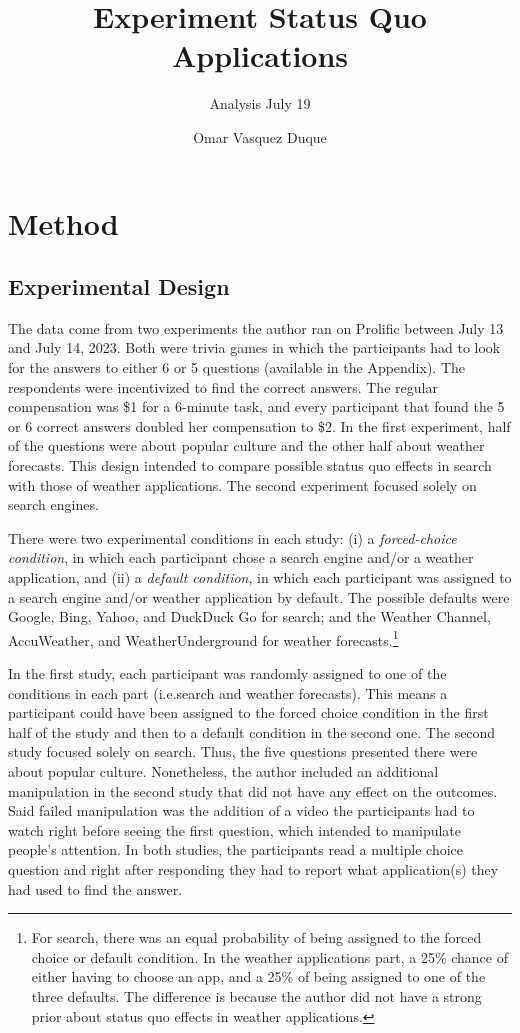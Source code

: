\documentclass[
  11pt,
]{article}
\title{Experiment Status Quo Applications}
\subtitle{Analysis July 19}
\author{Omar Vasquez Duque}
\date{}
\begin{document}
\maketitle

\hypertarget{method}{%
\section{Method}\label{method}}

\hypertarget{experimental-design}{%
\subsection{Experimental Design}\label{experimental-design}}

The data come from two experiments the author ran on Prolific between July 13 and July 14, 2023. Both were trivia games in which the participants had to look for the answers to either 6 or 5 questions (available in the Appendix). The respondents were incentivized to find the correct answers. The regular compensation was \$1 for a 6-minute task, and every participant that found the 5 or 6 correct answers doubled her compensation to \$2. In the first experiment, half of the questions were about popular culture and the other half about weather forecasts. This design intended to compare possible status quo effects in search with those of weather applications. The second experiment focused solely on search engines.

There were two experimental conditions in each study: (i) a \emph{forced-choice condition}, in which each participant chose a search engine and/or a weather application, and (ii) a \emph{default condition}, in which each participant was assigned to a search engine and/or weather application by default. The possible defaults were Google, Bing, Yahoo, and DuckDuck Go for search; and the Weather Channel, AccuWeather, and WeatherUnderground for weather forecasts.\footnote{For search, there was an equal probability of being assigned to the forced choice or default condition. In the weather applications part, a 25\% chance of either having to choose an app, and a 25\% of being assigned to one of the three defaults. The difference is because the author did not have a strong prior about status quo effects in weather applications.}

In the first study, each participant was randomly assigned to one of the conditions in each part (i.e.search and weather forecasts). This means a participant could have been assigned to the forced choice condition in the first half of the study and then to a default condition in the second one. The second study focused solely on search. Thus, the five questions presented there were about popular culture. Nonetheless, the author included an additional manipulation in the second study that did not have any effect on the outcomes. Said failed manipulation was the addition of a video the participants had to watch right before seeing the first question, which intended to manipulate people's attention. In both studies, the participants read a multiple choice question and right after responding they had to report what application(s) they had used to find the answer.
\end{document}
